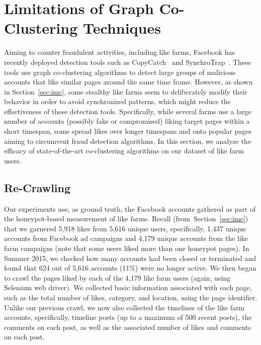 \documentclass[twocolumn,10pt,letterpaper]{article}
\begin{document}
%
%

\section{Limitations of Graph Co-Clustering Techniques}
\label{sec:coclustering}

Aiming to counter fraudulent activities, including like farms, Facebook has recently deployed detection tools such as CopyCatch~\cite{beutel2013copycatch} and SynchroTrap~\cite{cao14synchrotrap}. These tools use graph co-clustering algorithms to detect large groups of malicious accounts that like similar pages around the same time frame. However, as shown in Section~\ref{sec:imc}, some stealthy like farms seem to deliberately modify their behavior in order to avoid synchronized patterns, which might reduce the effectiveness of these detection tools. Specifically, while several farms use a large number of accounts (possibly fake or compromised) liking target pages within a short timespan, some spread likes over longer timespans and onto popular pages aiming to circumvent fraud detection algorithms.
%
In this section, we analyze the efficacy of state-of-the-art co-clustering algorithms on our dataset of like farm users.

\subsection{Re-Crawling}
\label{sec:data-new}
%
Our experiments use, as ground truth, the Facebook accounts gathered as part of the honeypot-based
measurement of like farms. Recall (from~Section~\ref{sec:imc}) that we garnered 5,918 likes from 5,616 unique users, specifically, 1,437 unique accounts from Facebook ad campaigns and 4,179 unique accounts from the like farm campaigns (note that some users liked more than one honeypot pages).
%
In Summer 2015, we checked how many accounts had been closed or terminated and found that 624 out of 5,616 accounts (11\%) were no longer active. We then began to crawl the pages liked by each of the 4,179 like farm users (again, using Selenium web driver). We collected basic information associated with each page, such as the total number of likes, category, and location, using the page identifier. Unlike our previous crawl, we now also collected the timelines of the like farm accounts, specifically, timeline posts (up to a maximum of 500 recent posts), the comments on each post, as well as the associated number of likes and comments on each post.
\end{document}
